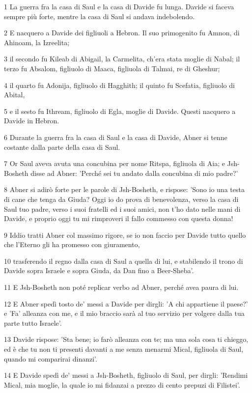 \par 1 La guerra fra la casa di Saul e la casa di Davide fu lunga. Davide si faceva sempre più forte, mentre la casa di Saul si andava indebolendo.
\par 2 E nacquero a Davide dei figliuoli a Hebron. Il suo primogenito fu Amnon, di Ahinoam, la Izreelita;
\par 3 il secondo fu Kileab di Abigail, la Carmelita, ch'era stata moglie di Nabal; il terzo fu Absalom, figliuolo di Maaca, figliuola di Talmai, re di Gheshur;
\par 4 il quarto fu Adonija, figliuolo di Hagghith; il quinto fu Scefatia, figliuolo di Abital,
\par 5 e il sesto fu Ithream, figliuolo di Egla, moglie di Davide. Questi nacquero a Davide in Hebron.
\par 6 Durante la guerra fra la casa di Saul e la casa di Davide, Abner si tenne costante dalla parte della casa di Saul.
\par 7 Or Saul aveva avuta una concubina per nome Ritspa, figliuola di Aia; e Jsh-Bosheth disse ad Abner: 'Perché sei tu andato dalla concubina di mio padre?'
\par 8 Abner si adirò forte per le parole di Jsh-Bosheth, e rispose: 'Sono io una testa di cane che tenga da Giuda? Oggi io do prova di benevolenza, verso la casa di Saul tuo padre, verso i suoi fratelli ed i suoi amici, non t'ho dato nelle mani di Davide, e proprio oggi tu mi rimproveri il fallo commesso con questa donna!
\par 9 Iddio tratti Abner col massimo rigore, se io non faccio per Davide tutto quello che l'Eterno gli ha promesso con giuramento,
\par 10 trasferendo il regno dalla casa di Saul a quella di lui, e stabilendo il trono di Davide sopra Israele e sopra Giuda, da Dan fino a Beer-Sheba'.
\par 11 E Jsh-Bosheth non poté replicar verbo ad Abner, perché avea paura di lui.
\par 12 E Abner spedì tosto de' messi a Davide per dirgli: 'A chi appartiene il paese?' e 'Fa' alleanza con me, e il mio braccio sarà al tuo servizio per volgere dalla tua parte tutto Israele'.
\par 13 Davide rispose: 'Sta bene; io farò alleanza con te; ma una sola cosa ti chieggo, ed è che tu non ti presenti davanti a me senza menarmi Mical, figliuola di Saul, quando mi comparirai dinanzi'.
\par 14 E Davide spedì de' messi a Jsh-Bosheth, figliuolo di Saul, per dirgli: 'Rendimi Mical, mia moglie, la quale io mi fidanzai a prezzo di cento prepuzi di Filistei'.
